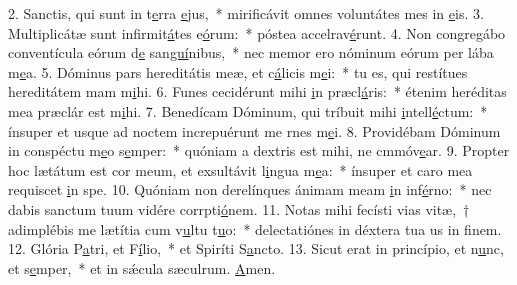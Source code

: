 2. Sanctis, qui sunt in t\uline{e}rra \uline{e}jus,~* mirificávit omnes voluntátes mes in \uline{e}is.
3. Multiplicátæ sunt infirmit\uline{á}tes e\uline{ó}rum:~* póstea accelrav\uline{é}runt.
4. Non congregábo conventícula eórum d\uline{e} san\uline{guí}nibus,~* nec memor ero nóminum eórum per lába m\uline{e}a.
5. Dóminus pars hereditátis meæ, et c\uline{á}licis m\uline{e}i:~* tu es, qui restítues hereditátem mam m\uline{i}hi.
6. Funes cecidérunt mihi \uline{i}n præcl\uline{á}ris:~* étenim heréditas mea præclár est m\uline{i}hi.
7. Benedícam Dóminum, qui tríbuit mihi \uline{i}ntell\uline{é}ctum:~* ínsuper et usque ad noctem increpuérunt me rnes m\uline{e}i.
8. Providébam Dóminum in conspéctu m\uline{e}o s\uline{e}mper:~* quóniam a dextris est mihi, ne cmmóv\uline{e}ar.
9. Propter hoc lætátum est cor meum, et exsultávit l\uline{i}ngua m\uline{e}a:~* ínsuper et caro mea requiscet \uline{i}n spe.
10. Quóniam non derelínques ánimam meam \uline{i}n inf\uline{é}rno:~* nec dabis sanctum tuum vidére corrpti\uline{ó}nem.
11. Notas mihi fecísti vias vitæ,~† adimplébis me lætítia cum v\uline{u}ltu t\uline{u}o:~* delectatiónes in déxtera tua us in f\uline{i}nem.
12. Glória P\uline{a}tri, et F\uline{í}lio,~* et Spiríti S\uline{a}ncto.
13. Sicut erat in princípio, et n\uline{u}nc, et s\uline{e}mper,~* et in sǽcula sæculrum. \uline{A}men.
